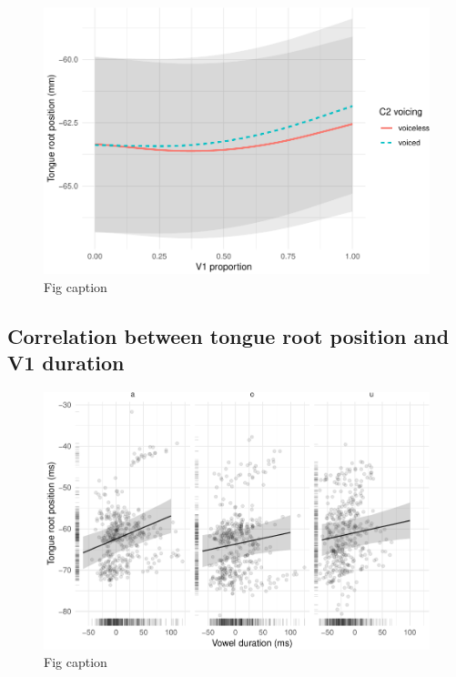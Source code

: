 \documentclass[12pt,]{article}
\begin{document}
\begin{figure}
\includegraphics[width=\linewidth]{2018-tra_files/figure-latex/tra-gam-plot-1} \caption{Fig caption}\label{f:tra-gam-plot}
\end{figure}

\hypertarget{correlation-between-tongue-root-position-and-v1-duration}{%
\subsection{Correlation between tongue root position and V1
duration}\label{correlation-between-tongue-root-position-and-v1-duration}}

\label{s:trp-vdur}

\begin{figure}
\includegraphics[width=\linewidth]{2018-tra_files/figure-latex/tra-lm-2-plot-1} \caption{Fig caption}\label{f:tra-lm-2-plot}
\end{figure}
\end{document}
